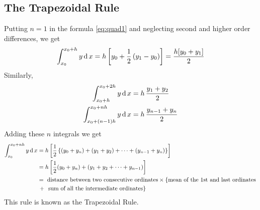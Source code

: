 \documentclass[12pt,class=book,crop=false]{standalone}
\begin{document}
\subsection{The Trapezoidal Rule}
Putting $ n=1 $ in the formula \eqref{eq:quad1} and neglecting second and higher order differences, we get
\[
    \int_{x_0}^{x_0+h} y\,\mathrm{d}\, x=h\left[ y_0+\frac{1}{2}\left( y_1-y_0 \right) \right]=\frac{h[y_0+y_1]}{2}
\]
Similarly,
\begin{align*}
    \int_{x_0+h}^{x_0+2h} y\,\mathrm{d}\, x      & =h \,\frac{y_1+y_2}{2}    \\
    \int_{x_0+(n-1)h}^{x_0+nh} y\,\mathrm{d}\, x & =h\,\frac{y_{n-1}+y_n}{2}
\end{align*}
Adding these $ n $ integrals we get
\begin{align*}
    \int_{x_0}^{x_0+nh} y\,\mathrm{d}\, x & =h\left[ \frac{1}{2}\left\{ (y_0+y_n)+(y_1+y_2)+\dots+(y_{n-1}+y_n) \right\} \right]                                \\
                             & =h\left[ \frac{1}{2}(y_0+y_n)+(y_1+y_2+\dots+y_{n-1}) \right]                                                       \\
                             & =\text{ distance between two consecutive ordinates} \times \left\{ \text{mean of the 1st and last ordinates}\right. \\
                             & \, +\left. \text{ sum of all the intermediate ordinates} \right\}
\end{align*}
This rule is known as the Trapezoidal Rule.
\end{document}
